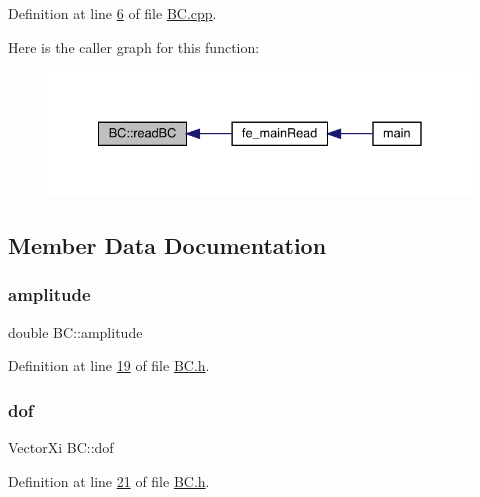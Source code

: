 Definition at line \hyperlink{_b_c_8cpp_source_l00006}{6} of file \hyperlink{_b_c_8cpp_source}{B\+C.\+cpp}.

Here is the caller graph for this function\+:\nopagebreak
\begin{figure}[H]
\begin{center}
\leavevmode
\includegraphics[width=335pt]{class_b_c_a8ceaa781f98b4128fa50611ff9481e1a_icgraph}
\end{center}
\end{figure}


\subsection{Member Data Documentation}
\mbox{\label{class_b_c_a25d7def8fdf5e988602759608b1507ea}} 
\subsubsection{\texorpdfstring{amplitude}{amplitude}}
{\footnotesize\ttfamily double B\+C\+::amplitude\hspace{0.3cm}{\ttfamily [private]}}



Definition at line \hyperlink{_b_c_8h_source_l00019}{19} of file \hyperlink{_b_c_8h_source}{B\+C.\+h}.

\mbox{\label{class_b_c_a4e53c8862da8b017b419b201911d9e00}} 
\subsubsection{\texorpdfstring{dof}{dof}}
{\footnotesize\ttfamily Vector\+Xi B\+C\+::dof\hspace{0.3cm}{\ttfamily [private]}}



Definition at line \hyperlink{_b_c_8h_source_l00021}{21} of file \hyperlink{_b_c_8h_source}{B\+C.\+h}.

